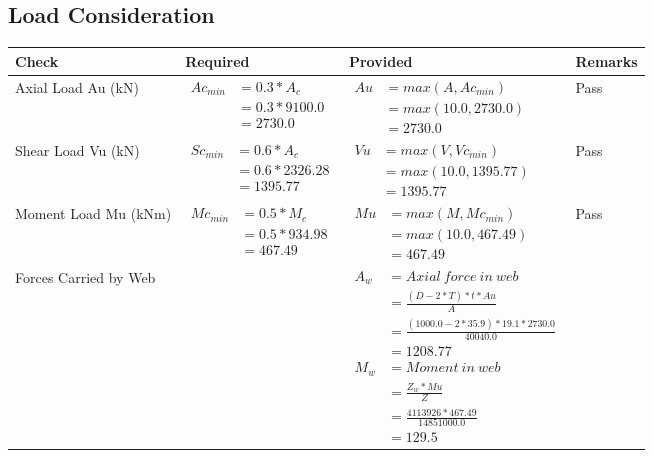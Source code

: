 \documentclass{article}%
\begin{document}
%
\newpage%
\subsection{Load Consideration}%
\label{subsec:LoadConsideration}%
\renewcommand{\arraystretch}{1.2}%
\begin{longtable}{|p{4cm}|p{5cm}|p{5.5cm}|p{1.5cm}|}%
\hline%
\rowcolor{OsdagGreen}%
Check&Required&Provided&Remarks\\%
\hline%
\endhead%
\hline%
Axial Load Au (kN)&$\begin{aligned} Ac_{min} &= 0.3 * A_c\\ &= 0.3 *9100.0\\ &=2730.0\end{aligned}$&$\begin{aligned} Au &= max(A,Ac_{min} )\\ &= max( 10.0,2730.0)\\ &=2730.0\end{aligned}$&Pass\\%
\hline%
Shear Load Vu (kN)&$\begin{aligned} Sc_{min} &= 0.6 * A_c\\ &= 0.6 *2326.28\\ &=1395.77\end{aligned}$&$\begin{aligned} Vu &= max(V,Vc_{min})\\ &=  max(10.0,1395.77)\\ &=1395.77\end{aligned}$&Pass\\%
\hline%
Moment Load Mu (kNm)&$\begin{aligned} Mc_{min} &= 0.5 * M_c\\ &= 0.5 *934.98\\ &=467.49\end{aligned}$&$\begin{aligned} Mu &= max(M,Mc_{min} )\\ &= max(10.0,467.49)\\ &=467.49\end{aligned}$&Pass\\%
\hline%
Forces Carried by Web&&$\begin{aligned}A_w &= Axial~ force~ in~ web  \\   &= \frac{(D- 2*T)*t* Au }{A} \\ &= \frac{(1000.0- 2*35.9)*19.1*2730.0 }{40040.0} \\ &=1208.77\\ M_w &= Moment ~in ~web  \\  &= \frac{Z_w * Mu}{Z} \\ &= \frac{4113926 * 467.49}{14851000.0} \\ &=129.5\end{aligned}$&\\%

\end{longtable}
\end{document}
